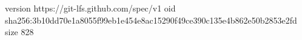 version https://git-lfs.github.com/spec/v1
oid sha256:3b10dd70e1a8055f99eb1e454e8ac15290f49ce390c135e4b862e50b2853e2fd
size 828

